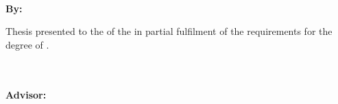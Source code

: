 \begin{titlepage}


	\newlength{\savedheadheight}
	\setlength{\savedheadheight}{\headheight}
	\newlength{\savedtopmargin}
	\setlength{\savedtopmargin}{\topmargin}
	\setlength{\headheight}{60pt}
	\addtolength{\topmargin}{-45pt}

	\thispagestyle{frontpage}

	\begin{center}

		\vspace*{4\baselineskip}


		{\Huge \textbf{\ThesisTitle\\}}%
		\vspace*{1.5\baselineskip}

		{\large\textbf{By: \ThesisAuthor}}\\%

		\vspace{1.5\baselineskip}

		{\large Thesis presented to the {\ThesisFaculty} of the {\ThesisUniversity} in partial fulfilment of the requirements for the degree of {\ThesisDegree}.}\\%

		\vspace{1.5\baselineskip}
		{\ThesisMonth}~{\ThesisYear}\\%
		{\ThesisLocation}\\%
		\vspace{1.5\baselineskip}

		{\large\textbf{Advisor: \ThesisAdvisor}}\\ %

	\end{center}

	\vspace*{4\baselineskip}


	\setlength{\headheight}{\savedheadheight}
	\setlength{\topmargin}{\savedtopmargin}

\end{titlepage}
